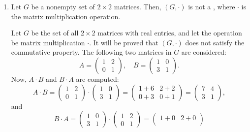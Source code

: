 \begin{enumerate}
  \newpage
  \begin{define}{Abelian Group}[def:abelian-group][red]
    A  \((G, *)\) is called an \textbf{Abelian group} 
    (or \textbf{commutative group}) if (and only if) \textbf{commutative}, that is,
    \[
    \text{For all } a, b \in G, \, a * b = b * a.
    \]
  \end{define}  
  \item Let $G$ be a nonempty set of $2 \times 2$ matrices. 
  Then, $(G, \cdot)$ is not a , 
  where $\cdot$ is the matrix multiplication operation.
  \begin{subprove}
    Let \(G\) be the set of all \(2 \times 2\) matrices with real entries, and let the operation be matrix multiplication \(\cdot\).
    It will be proved that \((G, \cdot)\) does not satisfy the commutative property.
    The following two matrices in \(G\) are considered:
    \[
    A = \begin{pmatrix}
    1 & 2 \\
    0 & 1
    \end{pmatrix}, \quad
    B = \begin{pmatrix}
    1 & 0 \\
    3 & 1
    \end{pmatrix}.
    \]
    Now, \(A \cdot B\) and \(B \cdot A\) are computed:
    \[
    A \cdot B = \begin{pmatrix}
    1 & 2 \\
    0 & 1
    \end{pmatrix} \cdot \begin{pmatrix}
    1 & 0 \\
    3 & 1
    \end{pmatrix} = \begin{pmatrix}
    1 + 6 & 2 + 2 \\
    0 + 3 & 0 + 1
    \end{pmatrix} = \begin{pmatrix}
    7 & 4 \\
    3 & 1
    \end{pmatrix},
    \]
    and
    \[
    B \cdot A = \begin{pmatrix}
    1 & 0 \\
    3 & 1
    \end{pmatrix} \cdot \begin{pmatrix}
    1 & 2 \\
    0 & 1
    \end{pmatrix} = \begin{pmatrix}
    1 + 0 & 2 + 0 \\

\end{pmatrix}\]
\end{subprove}
\end{enumerate}
